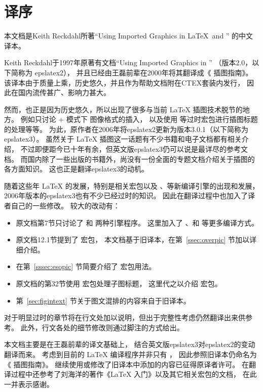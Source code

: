 
\section*{译序}

本文档是Keith Reckdahl所著``Using Imported Graphics in \LaTeX\ and \pdfLaTeX'' 的中文译本。

Keith Reckdahl于1997年原著有文档``Using Imported Graphics in \LaTeXe{}''
（版本2.0，以下简称为 epslatex2），
并且已经由王磊前辈在2000年将其翻译成《\LaTeXe{} 插图指南》。
该译本由于质量上乘，历史悠久，并且作为帮助文档附在CTEX套装内发行，
因此在国内流传甚广、影响力甚大。

然而，也正是因为历史悠久，所以出现了很多与当前 \LaTeX{} 插图技术脱节的地方。
例如只讨论 + 模式下  图像格式的插入，
以及使用  等过时宏包进行插图标题的处理等等。
为此，原作者在2006年将epslatex2更新为版本3.0.1（以下简称为 epslatex3）。
虽然关于 \LaTeX{} 插图这一话题有不少书籍和电子文档都有相关介绍，
不过即便距今已十年有余，但英文版epslatex3仍可以说是最详尽的参考文档。
而国内除了一些出版的书籍外，尚没有一份全面的专题文档介绍关于插图的各方面知识。
这也正是翻译epslatex3的动机。

随着这些年 \LaTeX{} 的发展，特别是相关宏包以及 \XeTeX{}、\LuaTeX 等新编译引擎的出现和发展，
2006年版本的epslatex3也有不少已经过时的知识。
因此在翻译过程中也加入了译者自己的一些修改。
较大的改动有：
\begin{itemize}
	\item 原文档第7节只讨论了  和  两种引擎程序。
	这里加入了 、和 等更多编译方式。
	\item 原文档12.1节提到了  宏包，
	本文档基于旧译本，在第~\ref{ssec:overpic} 节加以详细介绍。
    \item 在第~\ref{sssec:esopic} 节简要介绍了  宏包用法。
	\item 原文档的第32节使用  宏包处理子图标题，
	这里代之以介绍  宏包。
	\item 第~\ref{sec:figintext} 节关于图文混排的内容来自于旧译本。
\end{itemize}
对于明显过时的章节将在行文处加以说明，但出于完整性考虑仍然翻译出来供参考。
此外，行文各处的细节修改则通过脚注的方式给出。

本文档主要是在王磊前辈的译文基础上，
结合英文版epslatex3对epslatex2的变动翻译而来。
考虑到目前的 \LaTeX{} 编译程序并非只有 \pdfTeX{}，
因此参照旧译本仍命名为《\LaTeXe{} 插图指南》。
继续使用或修改了旧译本中添加的内容已征得原译者许可。
在翻译过程中还参考了刘海洋的著作《\LaTeX{} 入门》以及其它相关宏包的文档，
在此一并表示感谢。

